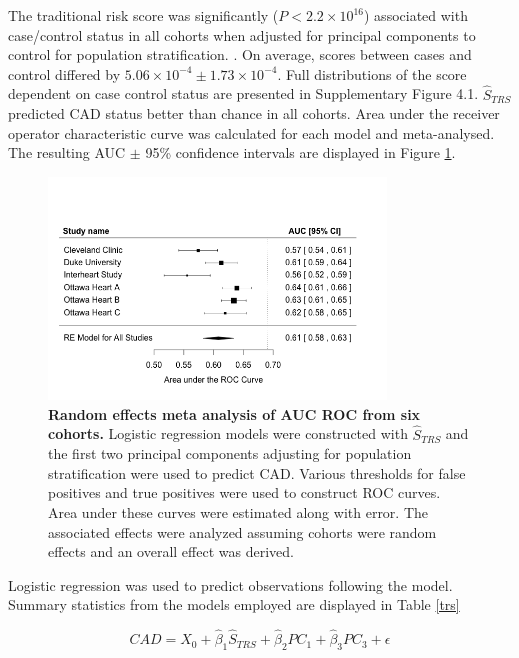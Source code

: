 The traditional risk score was significantly ($P < 2.2 \times 10^{16}$) associated with case/control status in all cohorts when adjusted for principal components to control for population stratification. \citep{Price2006,Zhang2013}. On average, scores between cases and control differed by $5.06 \times 10^{-4} \pm 1.73 \times 10^{-4}$. Full distributions of the score dependent on case control status are presented in Supplementary Figure 4.1. $\hat{S}_{TRS}$ predicted CAD status better than chance in all cohorts. Area under the receiver operator characteristic curve was calculated for each model and meta-analysed. The resulting AUC $\pm$ 95\% confidence intervals are displayed in Figure \ref{trs_meta}.

\begin{figure}[h]
\label{trs_meta}
\centering
\includegraphics[width=0.8\textwidth]{Figures/trs_meta.png}
\caption[Random effects meta analysis of AUC ROC from six cohorts.]{\textbf{Random effects meta analysis of AUC ROC from six cohorts.} Logistic regression models were constructed with $\hat{S}_{TRS}$ and the first two principal components adjusting for population stratification were used to predict \ac{CAD}. Various thresholds for false positives and true positives were used to construct \ac{ROC} curves. Area under these curves were estimated along with error. The associated effects were analyzed assuming cohorts were random effects and an overall effect was derived.}
\end{figure}

Logistic regression was used to predict observations following the model. Summary statistics from the models employed are displayed in Table \ref{trs}

$$ CAD = X_0 + \hat{\beta}_1 \hat{S}_{TRS} + \hat{\beta}_2 PC_1 + \hat{\beta}_3 PC_3 + \epsilon $$

